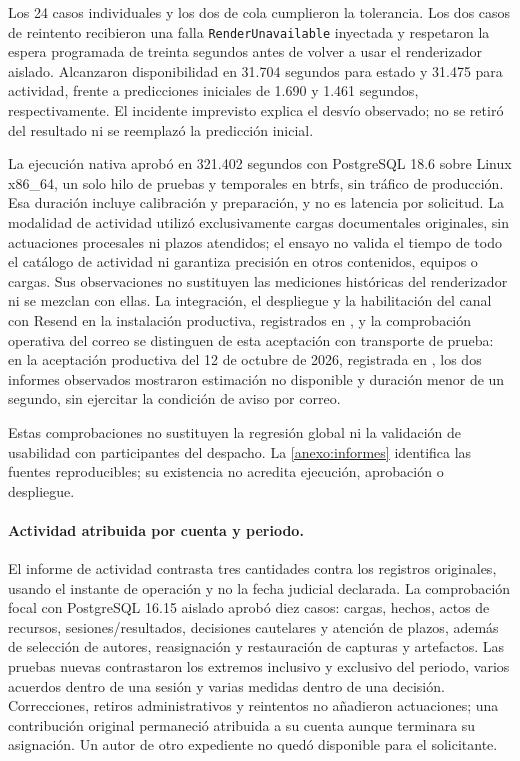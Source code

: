 Los 24 casos individuales y los dos de cola cumplieron la tolerancia. Los dos
casos de reintento recibieron una falla \texttt{RenderUnavailable} inyectada y
respetaron la espera programada de treinta segundos antes de volver a usar el
renderizador aislado. Alcanzaron disponibilidad en 31.704 segundos para estado
y 31.475 para actividad, frente a predicciones iniciales de 1.690 y 1.461
segundos, respectivamente. El incidente imprevisto explica el desv\'io observado;
no se retir\'o del resultado ni se reemplaz\'o la predicci\'on inicial.

La ejecuci\'on nativa aprob\'o en 321.402 segundos con PostgreSQL 18.6 sobre Linux
x86\_64, un solo hilo de pruebas y temporales en btrfs, sin tr\'afico de producci\'on.
Esa duraci\'on incluye calibraci\'on y preparaci\'on, y no es latencia por solicitud.
La modalidad de actividad utiliz\'o exclusivamente cargas documentales originales,
sin actuaciones procesales ni plazos atendidos; el ensayo no valida el tiempo
de todo el cat\'alogo de actividad ni garantiza precisi\'on en otros contenidos,
equipos o cargas. Sus observaciones no sustituyen las mediciones hist\'oricas del
renderizador ni se mezclan con ellas. La integraci\'on, el despliegue y la
habilitaci\'on del canal con Resend en la instalaci\'on productiva, registrados en
, y la comprobaci\'on operativa del correo se
distinguen de esta aceptaci\'on con transporte de prueba: en la aceptaci\'on
productiva del 12 de octubre de 2026, registrada en
, los dos informes observados mostraron
estimaci\'on no disponible y duraci\'on menor de un segundo, sin ejercitar la condici\'on de aviso por correo.

Estas comprobaciones no sustituyen la regresión global ni la validación de
usabilidad con participantes del despacho. La
\cref{anexo:informes} identifica las fuentes reproducibles; su existencia no
acredita ejecución, aprobación o despliegue.

\paragraph{Actividad atribuida por cuenta y periodo.}
El informe de actividad contrasta tres cantidades contra los registros originales,
usando el instante de operación y no la fecha judicial declarada. La comprobación
focal con PostgreSQL 16.15 aislado aprobó diez casos: cargas, hechos, actos de
recursos, sesiones/resultados, decisiones cautelares y atención de plazos, además
de selección de autores, reasignación y restauración de capturas y artefactos.
Las pruebas nuevas contrastaron los extremos inclusivo y exclusivo del periodo,
varios acuerdos dentro de una sesión y varias medidas dentro de una decisión.
Correcciones, retiros administrativos y reintentos no añadieron actuaciones;
una contribución original permaneció atribuida a su cuenta aunque terminara su
asignación. Un autor de otro expediente no quedó disponible para el solicitante.

